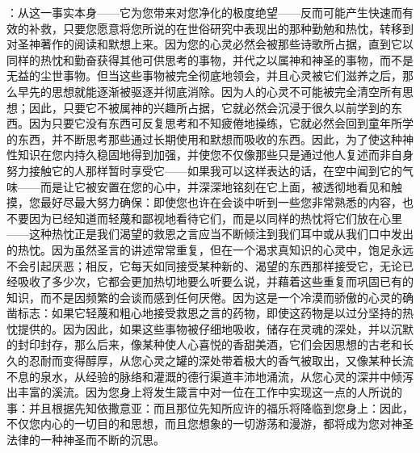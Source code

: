：从这一事实本身——它为您带来对您净化的极度绝望——反而可能产生快速而有效的补救，只要您愿意将您所说的在世俗研究中表现出的那种勤勉和热忱，转移到对圣神著作的阅读和默想上来。因为您的心灵必然会被那些诗歌所占据，直到它以同样的热忱和勤奋获得其他可供思考的事物，并代之以属神和神圣的事物，而不是无益的尘世事物。但当这些事物被完全彻底地领会，并且心灵被它们滋养之后，那么早先的思想就能逐渐被驱逐并彻底消除。因为人的心灵不可能被完全清空所有思想；因此，只要它不被属神的兴趣所占据，它就必然会沉浸于很久以前学到的东西。因为只要它没有东西可反复思考和不知疲倦地操练，它就必然会回到童年所学的东西，并不断思考那些通过长期使用和默想而吸收的东西。因此，为了使这种神性知识在您内持久稳固地得到加强，并使您不仅像那些只是通过他人复述而非自身努力接触它的人那样暂时享受它——如果我可以这样表达的话，在空中闻到它的气味——而是让它被安置在您的心中，并深深地铭刻在它上面，被透彻地看见和触摸，您最好尽最大努力确保：即使您也许在会谈中听到一些您非常熟悉的内容，也不要因为已经知道而轻蔑和鄙视地看待它们，而是以同样的热忱将它们放在心里——这种热忱正是我们渴望的救恩之言应当不断倾注到我们耳中或从我们口中发出的热忱。因为虽然圣言的讲述常常重复，但在一个渴求真知识的心灵中，饱足永远不会引起厌恶；相反，它每天如同接受某种新的、渴望的东西那样接受它，无论已经吸收了多少次，它都会更加热切地要么听要么说，并藉着这些重复而巩固已有的知识，而不是因频繁的会谈而感到任何厌倦。因为这是一个冷漠而骄傲的心灵的确凿标志：如果它轻蔑和粗心地接受救恩之言的药物，即使这药物是以过分坚持的热忱提供的。因为因此，如果这些事物被仔细地吸收，储存在灵魂的深处，并以沉默的封印封存，那么后来，像某种使人心喜悦的香甜美酒，它们会因思想的古老和长久的忍耐而变得醇厚，从您心灵之罐的深处带着极大的香气被取出，又像某种长流不息的泉水，从经验的脉络和灌溉的德行渠道丰沛地涌流，从您心灵的深井中倾泻出丰富的溪流。因为您身上将发生箴言中对一位在工作中实现这一点的人所说的事：并且根据先知依撒意亚：而且那位先知所应许的福乐将降临到您身上：因此，不仅您内心的一切目的和思想，而且您想象的一切游荡和漫游，都将成为您对神圣法律的一种神圣而不断的沉思。\par

